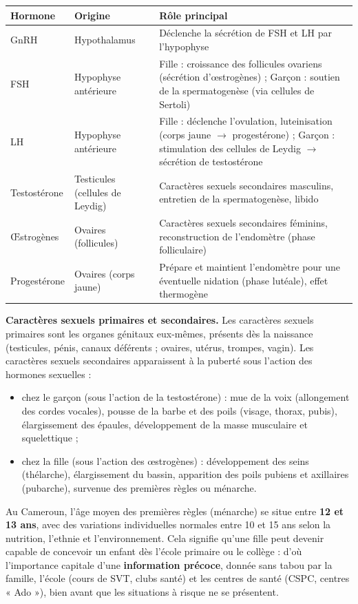 \documentclass[11pt]{article}
\newcommand{\cle}[1]{{\popxbold\color{popdark}#1}}
\begin{document}
\begin{center}
\begin{tabularx}{\linewidth}{|l|X|X|}
\hline
\rowcolor{popblueL} \textbf{Hormone} & \textbf{Origine} & \textbf{Rôle principal} \\
\hline
GnRH & Hypothalamus & Déclenche la sécrétion de FSH et LH par l'hypophyse \\
\hline
FSH & Hypophyse antérieure & Fille : croissance des follicules ovariens (sécrétion d'œstrogènes) ; Garçon : soutien de la spermatogenèse (via cellules de Sertoli) \\
\hline
LH & Hypophyse antérieure & Fille : déclenche l'ovulation, luteinisation (corps jaune $\to$ progestérone) ; Garçon : stimulation des cellules de Leydig $\to$ sécrétion de testostérone \\
\hline
Testostérone & Testicules (cellules de Leydig) & Caractères sexuels secondaires masculins, entretien de la spermatogenèse, libido \\
\hline
Œstrogènes & Ovaires (follicules) & Caractères sexuels secondaires féminins, reconstruction de l'endomètre (phase folliculaire) \\
\hline
Progestérone & Ovaires (corps jaune) & Prépare et maintient l'endomètre pour une éventuelle nidation (phase lutéale), effet thermogène \\
\hline
\end{tabularx}
\end{center}

\textbf{Caractères sexuels primaires et secondaires.} Les \cle{caractères sexuels primaires} sont les organes génitaux eux-mêmes, présents dès la naissance (testicules, pénis, canaux déférents ; ovaires, utérus, trompes, vagin). Les \cle{caractères sexuels secondaires} apparaissent à la puberté sous l'action des hormones sexuelles :
\begin{itemize}
\item chez le garçon (sous l'action de la testostérone) : mue de la voix (allongement des cordes vocales), pousse de la barbe et des poils (visage, thorax, pubis), élargissement des épaules, développement de la masse musculaire et squelettique ;
\item chez la fille (sous l'action des œstrogènes) : développement des seins (thélarche), élargissement du bassin, apparition des poils pubiens et axillaires (pubarche), survenue des \cle{premières règles} ou \cle{ménarche}.
\end{itemize}

\begin{savaistu}[Et au Cameroun ?]
Au Cameroun, l'âge moyen des premières règles (ménarche) se situe entre \textbf{12 et 13 ans}, avec des variations individuelles normales entre 10 et 15 ans selon la nutrition, l'ethnie et l'environnement. Cela signifie qu'une fille peut devenir capable de concevoir un enfant dès l'école primaire ou le collège : d'où l'importance capitale d'une \textbf{information précoce}, donnée sans tabou par la famille, l'école (cours de SVT, clubs santé) et les centres de santé (CSPC, centres « Ado »), bien avant que les situations à risque ne se présentent.
\end{savaistu}
\end{document}
